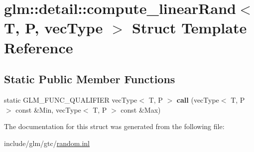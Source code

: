 \hypertarget{structglm_1_1detail_1_1compute__linearRand}{}\section{glm\+:\+:detail\+:\+:compute\+\_\+linear\+Rand$<$ T, P, vec\+Type $>$ Struct Template Reference}
\label{structglm_1_1detail_1_1compute__linearRand}
\subsection*{Static Public Member Functions}
\begin{DoxyCompactItemize}
\item 
\mbox{\label{structglm_1_1detail_1_1compute__linearRand_a8eb63b699b38b830ef191d0ce323efd6}} 
static G\+L\+M\+\_\+\+F\+U\+N\+C\+\_\+\+Q\+U\+A\+L\+I\+F\+I\+ER vec\+Type$<$ T, P $>$ {\bfseries call} (vec\+Type$<$ T, P $>$ const \&Min, vec\+Type$<$ T, P $>$ const \&Max)
\end{DoxyCompactItemize}


The documentation for this struct was generated from the following file\+:\begin{DoxyCompactItemize}
\item 
include/glm/gtc/\hyperlink{random_8inl}{random.\+inl}\end{DoxyCompactItemize}
